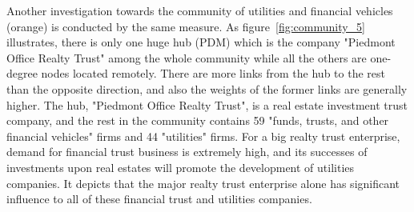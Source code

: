 Another investigation towards the community of utilities and financial vehicles (orange) is conducted by the same measure. As figure~\ref{fig:community_5} illustrates, there is only one huge hub (PDM) which is the company "Piedmont Office Realty Trust" among the whole community while all the others are one-degree nodes located remotely. There are more links from the hub to the rest than the opposite direction, and also the weights of the former links are generally higher. The hub, "Piedmont Office Realty Trust", is a real estate investment trust company, and the rest in the community contains 59 "funds, trusts, and other financial vehicles" firms and 44 "utilities" firms. For a big realty trust enterprise, demand for financial trust business is extremely high, and its successes of investments upon real estates will promote the development of utilities companies. It depicts that the major realty trust enterprise alone has significant influence to all of these financial trust and utilities companies.

